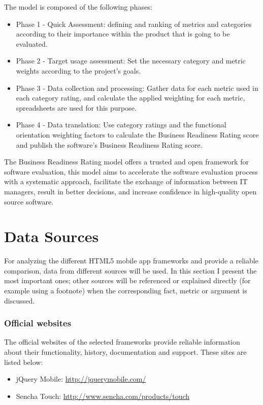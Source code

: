 \documentclass[a4paper,12pt]{book}
\begin{document}
The model is composed of the following phases:
\begin{itemize}
\item Phase 1 - Quick Assessment: defining and ranking of metrics and categories
according to their importance within the product that is going to be evaluated.
\item Phase 2 - Target usage assessment: Set the necessary category and metric
weights according to the project's goals.
\item Phase 3 - Data collection and processing: Gather data for each metric used
in each category rating, and calculate the applied weighting for each metric,
spreadsheets are used for this purpose.
\item Phase 4 - Data translation: Use category ratings and the functional
orientation weighting factors to calculate the Business Readiness Rating score
and publish the software’s Business Readiness Rating score.
\end{itemize}

The Business Readiness Rating model offers a trusted and open framework for
software evaluation, this model aims to accelerate the software evaluation
process with a systematic approach, facilitate the exchange of information
between IT managers, result in better decisions, and increase confidence in
high-quality open source software.

\section{Data Sources}
\label{sec:data}

For analyzing the different HTML5 mobile app frameworks and
provide a reliable comparison, data from different sources will be used. In
this section I present the most important ones; other sources will be
referenced or explained directly (for example using a footnote) when the
corresponding fact, metric or argument is discussed.

\subsubsection{Official websites}
The official websites of the selected frameworks provide reliable information about their functionality, history, documentation and support. These sites are listed below:
\begin{itemize}
 \item jQuery Mobile: \url{http://jquerymobile.com/}
 \item Sencha Touch: \url{http://www.sencha.com/products/touch}
\end{itemize}
\end{document}
